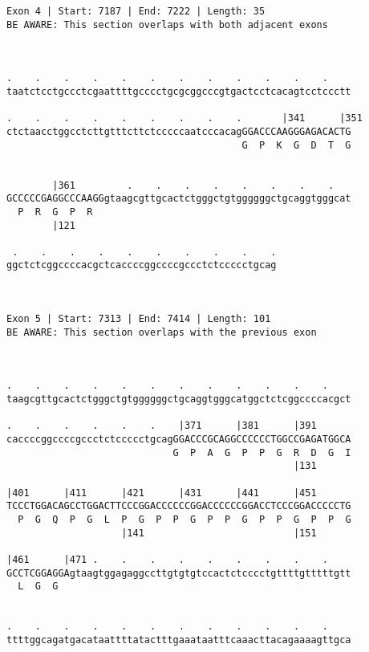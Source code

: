 \documentclass{article}
\begin{document}
\begin{Verbatim}
Exon 4 | Start: 7187 | End: 7222 | Length: 35
BE AWARE: This section overlaps with both adjacent exons



.    .    .    .    .    .    .    .    .    .    .    .    
taatctcctgccctcgaattttgcccctgcgcggcccgtgactcctcacagtcctccctt
                                                            
.    .    .    .    .    .    .    .    .       |341      |351
ctctaacctggcctcttgtttcttctcccccaatcccacagGGACCCAAGGGAGACACTG
                                         G  P  K  G  D  T  G
                                                            
  
        |361         .    .    .    .    .    .    .    .   
GCCCCCGAGGCCCAAGGgtaagcgttgcactctgggctgtggggggctgcaggtgggcat
  P  R  G  P  R                                             
        |121                                                
  
 .    .    .    .    .    .    .    .    .    .
ggctctcggccccacgctcaccccggccccgccctctccccctgcag
                                               
                                               
 
Exon 5 | Start: 7313 | End: 7414 | Length: 101
BE AWARE: This section overlaps with the previous exon



.    .    .    .    .    .    .    .    .    .    .    .    
taagcgttgcactctgggctgtggggggctgcaggtgggcatggctctcggccccacgct
                                                            
.    .    .    .    .    .    |371      |381      |391      
caccccggccccgccctctccccctgcagGGACCCGCAGGCCCCCCTGGCCGAGATGGCA
                             G  P  A  G  P  P  G  R  D  G  I
                                                  |131      
  
|401      |411      |421      |431      |441      |451      
TCCCTGGACAGCCTGGACTTCCCGGACCCCCCGGACCCCCCGGACCTCCCGGACCCCCTG
  P  G  Q  P  G  L  P  G  P  P  G  P  P  G  P  P  G  P  P  G
                    |141                          |151      
  
|461      |471 .    .    .    .    .    .    .    .    .    
GCCTCGGAGGAgtaagtggagaggccttgtgtgtccactctcccctgttttgtttttgtt
  L  G  G                                                   
                                                            
  
.    .    .    .    .    .    .    .    .    .    .    .    
ttttggcagatgacataattttatactttgaaataatttcaaacttacagaaaagttgca
                                                            

\end{Verbatim}
\end{document}
